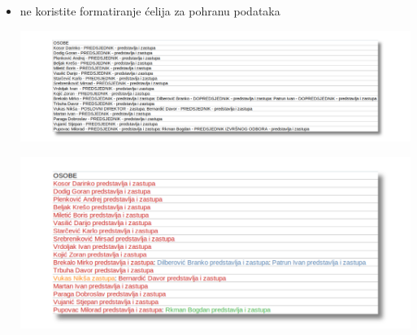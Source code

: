 \documentclass[aspectratio=169]{beamer}
\begin{document}
\begin{frame}
    \begin{itemize}
        \vspace*{1em}

        \item ne koristite formatiranje ćelija za pohranu podataka

        \pause

        \vspace{1em}

        \hspace{-.8em}%
        \includegraphics[scale=.30]{images/colorless-sadness.png}

        \pause
        
        \includegraphics[scale=.30]{images/colorful-sadness.png}

    \end{itemize}
\end{frame}
\end{document}
